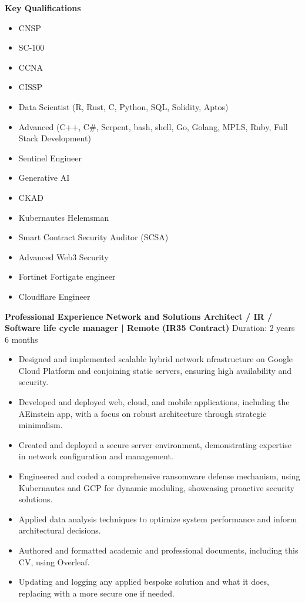 \documentclass[12pt, a4paper]{article}
\begin{document}
\vspace{0.2cm}
\textcolor{blue}{\hrulefill}
\vspace{0.2cm}

\textbf{Key Qualifications}
\begin{multicols}{3}
\begin{itemize}[noitemsep,nolistsep]
\item CNSP
\item SC-100
\item CCNA
\item CISSP
\item Data Scientist (R, Rust, C, Python, SQL, Solidity, Aptos)
\item Advanced (C++, C#, Serpent, bash, shell, Go, Golang, MPLS, Ruby, Full Stack Development)
\item Sentinel Engineer 
\item Generative AI
\item CKAD
\item Kubernautes Helemsman
\item Smart Contract Security Auditor (SCSA)
\item Advanced Web3 Security
\item Fortinet Fortigate engineer
\item Cloudflare Engineer

\end{itemize}
\end{multicols}

\vspace{0.2cm}
\textcolor{blue}{\hrulefill}
\vspace{0.2cm}

\textbf{Professional Experience}
\textbf{Network and Solutions Architect / IR / Software life cycle manager | Remote (IR35 Contract)}
Duration: 2 years 6 months
\begin{itemize}[noitemsep,nolistsep]
\item Designed and implemented scalable hybrid network nfrastructure on Google Cloud Platform and conjoining static servers, ensuring high availability and security.
\item Developed and deployed web, cloud, and mobile applications, including the AEinstein app, with a focus on robust architecture through strategic minimalism.
\item Created and deployed a secure server environment, demonstrating expertise in network configuration and management.
\item Engineered and coded a comprehensive ransomware defense mechanism, using Kubernautes and GCP for dynamic moduling, showcasing proactive security solutions.
\item Applied data analysis techniques to optimize system performance and inform architectural decisions.
\item Authored and formatted academic and professional documents, including this CV, using Overleaf.
\item Updating and logging any applied bespoke solution and what it does, replacing with a more secure one if needed.
\end{itemize}
\end{document}

